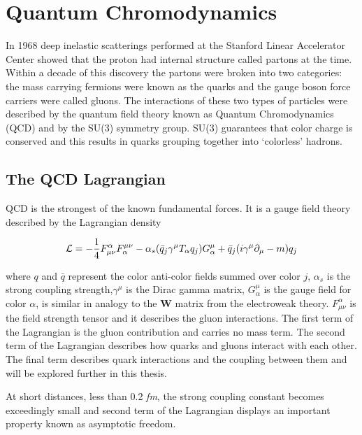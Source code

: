 
\chapter{Quantum Chromodynamics} \label{ch:qcd}
In 1968 deep inelastic scatterings performed at the Stanford Linear Accelerator Center showed that the proton had internal structure\cite{Riordan1287} called partons at the time.  Within a decade of this discovery the partons were broken into two categories: the mass carrying fermions were known as the quarks and the gauge boson force carriers were called gluons.  The interactions of these two types of particles were described by the quantum field theory known as Quantum Chromodynamics (QCD) and by the SU(3) symmetry group.  SU(3) guarantees that color charge is conserved and this results in quarks grouping together into `colorless' hadrons.

\section{The QCD Lagrangian}
QCD is the strongest of the known fundamental forces.  It is a gauge field theory described by the Lagrangian density

\begin{equation}
{\cal L}=-\frac{1}{4}F^{\alpha}_{\mu\nu}F^{\mu\nu}_{\alpha}
- \alpha_{s} (\bar{q}_{j}\gamma^{\mu}T_{\alpha}q_{j})G_{\alpha}^{\mu}
+ \bar{q}_{j}(i\gamma^{\mu} \partial_{\mu} - m)q_{j}
\label{eq:lagrangian}
\end{equation}

\noindent
where $q$ and $\bar{q}$ represent the color anti-color fields summed over color $j$, $\alpha_{s}$ is the strong coupling strength,$\gamma^{\mu}$ is the Dirac gamma matrix, $G_{\alpha}^{\mu}$ is the gauge field for color \textit{$\alpha$}, is similar in analogy to the \textbf{W} matrix from the electroweak theory.  $F^{\alpha}_{\mu\nu}$ is the field strength tensor and it describes the gluon interactions. The first term of the Lagrangian is the gluon contribution and carries no mass term.  The second term of the Lagrangian describes how quarks and gluons interact with each other. The final term describes quark interactions and the coupling between them and will be explored further in this thesis.

At short distances, less than 0.2 \textit{fm}, the strong coupling constant becomes exceedingly small and second term of the Lagrangian displays an important property known as asymptotic freedom\cite{Wilczek:2005az}. 

